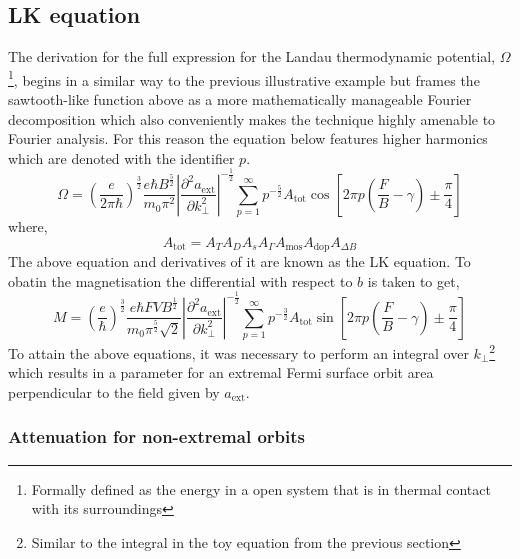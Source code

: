 \subsection{\acl{LK} equation}

The derivation for the full expression for the Landau thermodynamic potential, $\Omega$\footnote{Formally defined as the energy in a open system that is in thermal contact with its surroundings}, begins in a similar way to the previous illustrative example but frames the sawtooth-like function above as a more mathematically manageable Fourier decomposition which also conveniently makes the technique highly amenable to Fourier analysis. For this reason the equation below features higher harmonics which are denoted with the identifier $p$.
\begin{equation}
\Omega = \left(\frac{e}{2\pi\hbar}\right)^{\frac{3}{2}}\frac{e\hbar B^{\frac{5}{2}}}{m_0 \pi^2}\left| \frac{\partial^2 a_{\textrm{ext}}}{\partial k^2_\perp}\right|^{-\frac{1}{2}}\sum_{p=1}^{\infty}p^{-\frac{5}{2}}A_{\textrm{tot}}\cos\left[2\pi p\left(\frac{F}{B} - \gamma\right)\pm\frac{\pi}{4}\right]
\end{equation}
where,
\begin{equation}
A_{\textrm{tot}} = A_T A_D A_s A_{\Gamma} A_{\textrm{mos}} A_{\textrm{dop}} A_{\Delta B}
\end{equation}
The above equation and derivatives of it are known as the \ac{LK} equation. To obatin the magnetisation the differential with respect to $b$ is taken to get,
\begin{equation}
M = \left(\frac{e}{\hbar}\right)^{\frac{3}{2}}\frac{e\hbar F V B^{\frac{1}{2}}}{m_0 \pi^\frac{5}{2}\sqrt{2}}\left| \frac{\partial^2 a_{\textrm{ext}}}{\partial k^2_\perp}\right|^{-\frac{1}{2}}\sum_{p=1}^{\infty}p^{-\frac{3}{2}}A_{\textrm{tot}}\sin\left[2\pi p\left(\frac{F}{B} - \gamma\right)\pm\frac{\pi}{4}\right]
\end{equation}
To attain the above equations, it was necessary to perform an integral over $k_\perp$\footnote{Similar to the integral in the toy equation from the previous section} which results in a parameter for an extremal Fermi surface orbit area perpendicular to the field given by $a_{\textrm{ext}}$. 

\subsubsection{Attenuation for non-extremal orbits}

